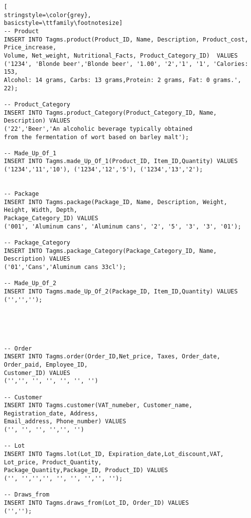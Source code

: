 \begin{lstlisting}[
stringstyle=\color{grey},
basicstyle=\ttfamily\footnotesize]
-- Product
INSERT INTO Tagms.product(Product_ID, Name, Description, Product_cost, Price_increase,
Volume, Net_weight, Nutritional_Facts, Product_Category_ID)  VALUES 
('1234', 'Blonde beer','Blonde beer', '1.00', '2','1', '1', 'Calories: 153, 
Alcohol: 14 grams, Carbs: 13 grams,Protein: 2 grams, Fat: 0 grams.', 22);

-- Product_Category
INSERT INTO Tagms.product_Category(Product_Category_ID, Name, Description) VALUES 
('22','Beer','An alcoholic beverage typically obtained 
from the fermentation of wort based on barley malt');

-- Made_Up_Of_1
INSERT INTO Tagms.made_Up_Of_1(Product_ID, Item_ID,Quantity) VALUES
('1234','11','10'), ('1234','12','5'), ('1234','13','2');


-- Package
INSERT INTO Tagms.package(Package_ID, Name, Description, Weight, Height, Width, Depth, 
Package_Category_ID) VALUES
('001', 'Aluminum cans', 'Aluminum cans', '2', '5', '3', '3', '01');

-- Package_Category
INSERT INTO Tagms.package_Category(Package_Category_ID, Name, Description) VALUES 
('01','Cans','Aluminum cans 33cl');

-- Made_Up_Of_2
INSERT INTO Tagms.made_Up_Of_2(Package_ID, Item_ID,Quantity) VALUES
('','','');





-- Order
INSERT INTO Tagms.order(Order_ID,Net_price, Taxes, Order_date, Order_paid, Employee_ID, 
Customer_ID) VALUES 
('','', '', '', '', '', '')

-- Customer
INSERT INTO Tagms.customer(VAT_numeber, Customer_name, Registration_date, Address, 
Email_address, Phone_number) VALUES
('', '', '', '','', '')

-- Lot
INSERT INTO Tagms.lot(Lot_ID, Expiration_date,Lot_discount,VAT, Lot_price, Product_Quantity, 
Package_Quantity,Package_ID, Product_ID) VALUES 
('', '','','', '', '', '','', '');

-- Draws_from
INSERT INTO Tagms.draws_from(Lot_ID, Order_ID) VALUES 
('','');

\end{lstlisting}